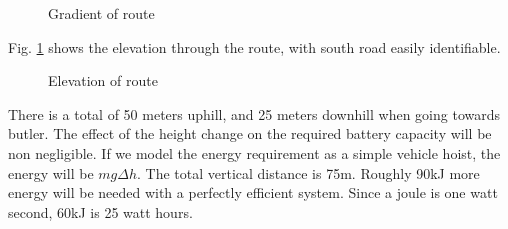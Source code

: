 \documentclass{article}
\begin{document}
\begin{figure}[H]
    \centering
    \caption{Gradient of route}
    \label{fig:route_el}
\end{figure}
Fig. \ref{fig:route_el} shows the elevation through the route, with south road easily identifiable. 
\begin{figure}[H]
    \centering
    \caption{Elevation of route}
    \label{fig:route_grad}
\end{figure}
There is a total of 50 meters uphill, and 25 meters downhill when going towards butler.
The effect of the height change on the required battery capacity will be non negligible.
If we model the energy requirement as a simple vehicle hoist, the energy will be $mg\Delta h$.
The total vertical distance is 75m.
Roughly 90kJ more energy will be needed with a perfectly efficient system.
Since a joule is one watt second, 60kJ is 25 watt hours.
\end{document}
